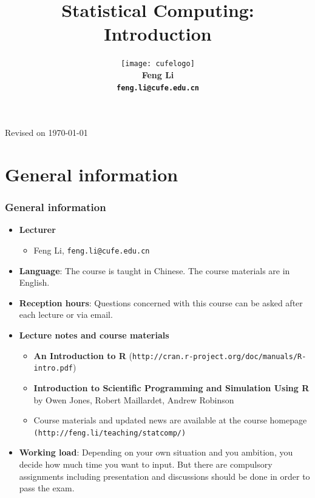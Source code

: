 \documentclass[10pt]{beamer}
\title[Statistical Computing]{{\textbf{Statistical Computing: Introduction}}}
\author[Feng Li]{\texttt{[image: cufelogo]}\\
  \vspace{0.5cm}\textbf{Feng Li\\\texttt{feng.li@cufe.edu.cn}}}
\date{}
\institute[Stat \& Math, CUFE]{\footnotesize{\textbf{School of Statistics and
      Mathematics\\ Central University of Finance and Economics}}}
\begin{document}
\begin{frame}[plain]
  \titlepage
  \tiny{Revised on \today}
\end{frame}


\section{General information}
\begin{frame}
  \frametitle{General information}
  \begin{itemize}

  \item \textbf{Lecturer}

    \begin{itemize}
    \item Feng Li, \texttt{feng.li@cufe.edu.cn}
    \end{itemize}
  \item \textbf{Language}: The course is taught in Chinese. The course
    materials are in English. %

  \item \textbf{Reception hours}: Questions concerned with this course can be
    asked after each lecture or via email.

  \item \textbf{Lecture notes and course materials}

    \begin{itemize}

    \item \textbf{An Introduction to R} (\texttt{http://cran.r-project.org/doc/manuals/R-intro.pdf})

    \item \textbf{Introduction to Scientific Programming and Simulation Using R} by Owen
      Jones, Robert Maillardet, Andrew Robinson

    \item Course materials and updated news are available at the course homepage
      \texttt{(http://feng.li/teaching/statcomp/)}

    \end{itemize}


  \item \textbf{Working load}: Depending on your own situation and you
    ambition, you decide how much time you want to input. But there are
    compulsory assignments including presentation and discussions should be
    done in order to pass the exam.

  \end{itemize}
\end{frame}
\end{document}
